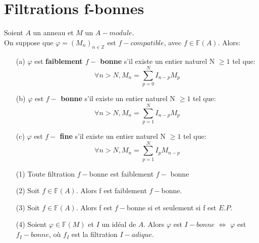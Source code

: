 \section{Filtrations f-bonnes}
\begin{madefinition}
	Soient $A$ un anneau et $M$ un $A-module$.\\
	On suppose que $\varphi=(M_n)_{n \in \mathbb{Z}}$ est $f-compatible$, avec $f \in \mathbb{F}(A)$. Alors:
	\begin{itemize}
		\item[(a)] $\varphi$ est \textbf{faiblement $f-$ bonne} s'il existe un entier naturel N $\geqslant 1$ tel que:
		\[\forall n > N, M_{n}=\sum_{p=0}^{N}I_{n-p}M_{p} \]
		\item[(b)] $\varphi$ est \textbf{$f-$ bonne} s'il existe un entier naturel N $\geqslant 1$ tel que:
		\[\forall n > N, M_{n}=\sum_{p=1}^{N}I_{n-p}M_{p} \]
		\item[(c)] $\varphi$ est \textbf{$f-$ fine} s'il existe un entier naturel N $\geqslant 1$ tel que:
		\[\forall n > N, M_{n}=\sum_{p=1}^{N}I_{p}M_{n-p} \]
	\end{itemize} 
\end{madefinition}
\begin{maremarque}
	\begin{enumerate}
		\item[(1)] Toute filtration $f-$bonne est faiblement $f-$ bonne
		\item[(2)] Soit $f \in \mathbb{F}(A)$. Alors f est faiblement $f-$bonne.
		\item[(3)] Soit $f \in \mathbb{F}(A)$. Alors f est $f-$bonne si et seulement si f est $E.P.$
		\item[(4)] Soient $\varphi \in \mathbb{F}(M)$ et $I$ un idéal de $A$. Alors $\varphi$ est $I-bonne$ $\Longleftrightarrow$ $\varphi$ est $f_{I}-bonne$, où $f_{I}$ est la filtration $I-adique$.
	\end{enumerate}
\end{maremarque}
